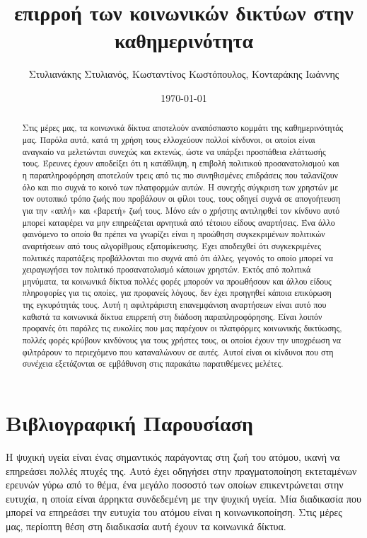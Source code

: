 \documentclass{article}
\title{\grΗ επιρροή των κοινωνικών δικτύων στην καθημερινότητα}
\author{\gr Στυλιανάκης Στυλιανός, Κωσταντίνος Κωστόπουλος, Κονταράκης Ιωάννης}
\date{\today}
\newcommand{\gr}{\selectlanguage{greek}}
\begin{document}
\maketitle  
\begin{abstract}
\gr
Στις μέρες μας, τα κοινωνικά δίκτυα αποτελούν αναπόσπαστο κομμάτι της καθημερινότητάς μας. Παρόλα αυτά, κατά τη χρήση τους ελλοχεύουν πολλοί κίνδυνοι, οι οποίοι είναι αναγκαίο να μελετώνται συνεχώς και εκτενώς, ώστε να υπάρξει προσπάθεια ελάττωσής τους. Έρευνες έχουν αποδείξει ότι η κατάθλιψη, η επιβολή πολιτικού προσανατολισμού και η παραπληροφόρηση αποτελούν τρεις από τις πιο συνηθισμένες επιδράσεις που ταλανίζουν όλο και πιο συχνά το κοινό των πλατφορμών αυτών. Η συνεχής σύγκριση των χρηστών με τον ουτοπικό τρόπο ζωής που προβάλουν οι φίλοι τους, τους οδηγεί συχνά σε απογοήτευση για την «απλή» και «βαρετή» ζωή τους. Μόνο εάν ο χρήστης αντιληφθεί τον κίνδυνο αυτό μπορεί καταφέρει να μην επηρεάζεται αρνητικά από τέτοιου είδους αναρτήσεις. Ένα άλλο φαινόμενο το οποίο θα πρέπει να γνωρίζει είναι η προώθηση συγκεκριμένων πολιτικών αναρτήσεων από τους αλγορίθμους εξατομίκευσης. Έχει αποδειχθεί ότι συγκεκριμένες πολιτικές παρατάξεις προβάλλονται πιο συχνά από ότι άλλες, γεγονός το οποίο μπορεί να χειραγωγήσει τον πολιτικό προσανατολισμό κάποιων χρηστών. Εκτός από πολιτικά μηνύματα, τα κοινωνικά δίκτυα πολλές φορές μπορούν να προωθήσουν και άλλου είδους πληροφορίες για τις οποίες, για προφανείς λόγους, δεν έχει προηγηθεί κάποια επικύρωση της εγκυρότητάς τους. Αυτή η αφιλτράριστη επανεμφάνιση αναρτήσεων είναι αυτό που καθιστά τα κοινωνικά δίκτυα επιρρεπή στη διάδοση παραπληροφόρησης. Είναι λοιπόν προφανές ότι παρόλες τις ευκολίες που μας παρέχουν οι πλατφόρμες κοινωνικής δικτύωσης, πολλές φορές κρύβουν κινδύνους για τους χρήστες τους, οι οποίοι έχουν την υποχρέωση να φιλτράρουν το περιεχόμενο που καταναλώνουν σε αυτές. Αυτοί είναι οι κίνδυνοι που στη συνέχεια εξετάζονται σε εμβάθυνση στις παρακάτω παρατιθέμενες μελέτες.
\end{abstract}
\clearpage 
\tableofcontents
\section{\gr Βιβλιογραφική Παρουσίαση}
\gr
Η ψυχική υγεία είναι ένας σημαντικός παράγοντας στη ζωή του ατόμου, ικανή να επηρεάσει πολλές πτυχές της. Αυτό έχει οδηγήσει στην πραγματοποίηση εκτεταμένων ερευνών γύρω από το θέμα, ένα μεγάλο ποσοστό των οποίων επικεντρώνεται στην ευτυχία, η οποία είναι άρρηκτα συνδεδεμένη με την ψυχική υγεία. Μία διαδικασία που μπορεί να επηρεάσει την ευτυχία του ατόμου είναι η κοινωνικοποίηση. Στις μέρες μας, περίοπτη θέση στη διαδικασία αυτή έχουν τα κοινωνικά δίκτυα.
\end{document}
